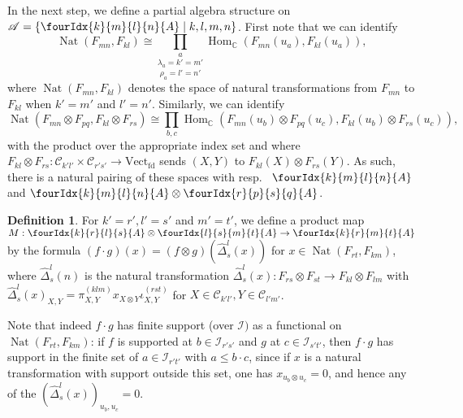 \documentclass[10pt]{article}
\DeclareMathOperator{\fin}{\mathrm{fd}}
\DeclareMathOperator{\Hom}{Hom}
\DeclareMathOperator{\Nat}{\mathrm{Nat}}
\newcommand{\C}{\mathbb{C}}
\newcommand{\CatC}{\mathcal{C}}
\newcommand{\Vect}{\mathrm{Vect}}
\newcommand{\Gr}[5]{\fourIdx{#2}{#4}{#3}{#5}{#1}}%
\theoremstyle{definition}
\newtheorem{Def}[Theorem]{Definition}
\numberwithin{equation}{section}
\begin{document}
In the next step, we define a partial algebra structure on $\mathscr{A} = \{\Gr{A}{k}{l}{m}{n}\mid k,l,m,n\}$. First note that we can identify \[\Nat(F_{mn},F_{kl}) \cong \underset{\rho_a=l'=n'}{\underset{\lambda_a=k'=m'}{\prod_a}} \Hom_{\C}(F_{mn}(u_a),F_{kl}(u_a)),\] where $\Nat(F_{mn},F_{kl})$ denotes the space of natural transformations from $F_{mn}$ to $F_{kl}$ when $k'=m'$ and $l'=n'$. Similarly, we can identify \[\Nat(F_{mn}\otimes F_{pq},F_{kl}\otimes F_{rs}) \cong  \prod_{b,c} \Hom_{\C}(F_{mn}(u_b)\otimes F_{pq}(u_c) ,F_{kl}(u_b)\otimes F_{rs}(u_c)),\] with the product over the appropriate index set and where $F_{kl}\otimes F_{rs}:\CatC_{k'l'}\times \CatC_{r's'}\rightarrow \Vect_{\fin}$ sends $(X,Y)$ to $F_{kl}(X)\otimes F_{rs}(Y).$ As such, there is a natural pairing of these spaces with resp.~ $\Gr{A}{k}{l}{m}{n}$ and $\Gr{A}{k}{l}{m}{n}\otimes \Gr{A}{r}{s}{p}{q}$. 

\begin{Def} For $k'=r', l'=s'$ and $m'=t'$, we define a product map $M:\Gr{A}{k}{l}{r}{s} \otimes \Gr{A}{l}{m}{s}{t}\rightarrow  \Gr{A}{k}{m}{r}{t}$ by the formula $(f\cdot g)(x) = (f\otimes g)( \hat{\Delta}^{l}_{s}(x))$ for $x \in \Nat(F_{rt},F_{km})$, where $\hat{\Delta}^l_s(n)$ is the natural transformation $\hat{\Delta}^l_s(x):  F_{rs}\otimes F_{st}\rightarrow F_{kl}\otimes F_{lm}$ with $\hat{\Delta}^l_s(x)_{X,Y} = \pi^{(klm)}_{X,Y}x_{X\otimes Y} \iota^{(rst)}_{X,Y}$ for $X\in \CatC_{k'l'},Y\in \CatC_{l'm'}$.
\end{Def}

Note that indeed $f\cdot g$ has finite support (over $\mathcal{I})$ as a functional on $\Nat(F_{rt},F_{km})$: if $f$ is supported at $b\in \mathcal{I}_{r's'}$ and $g$ at $c\in \mathcal{I}_{s't'}$, then $f\cdot g$ has support in the finite set of $a\in \mathcal{I}_{r't'}$ with $a\leq b\cdot c$, since if $x$ is a natural transformation with support outside this set, one has $x_{u_b\otimes u_c}=0$, and hence any of the $\left(\hat{\Delta}^l_s(x)\right)_{u_b,u_c} =0$.
\end{document}
